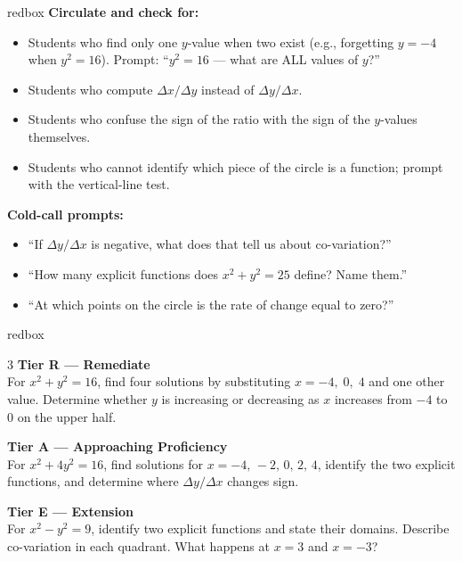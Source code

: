 \documentclass[10pt]{article}
\begin{document}
\begin{skillbox}{redbox}
\textbf{Circulate and check for:}
\begin{itemize}[leftmargin=1.5em, itemsep=2pt]
    \item Students who find only one $y$-value when two exist (e.g., forgetting $y = -4$ when
          $y^2 = 16$). Prompt: ``$y^2 = 16$ --- what are ALL values of $y$?''
    \item Students who compute $\Delta x/\Delta y$ instead of $\Delta y/\Delta x$.
    \item Students who confuse the sign of the ratio with the sign of the $y$-values themselves.
    \item Students who cannot identify which piece of the circle is a function; prompt with the
          vertical-line test.
\end{itemize}
\textbf{Cold-call prompts:}
\begin{itemize}[leftmargin=1.5em, itemsep=2pt]
    \item ``If $\Delta y/\Delta x$ is negative, what does that tell us about co-variation?''
    \item ``How many explicit functions does $x^2 + y^2 = 25$ define? Name them.''
    \item ``At which points on the circle is the rate of change equal to zero?''
\end{itemize}
\end{skillbox}

\begin{skillbox}{redbox}
\begin{multicols}{3}
\textbf{Tier R --- Remediate}\\
For $x^2 + y^2 = 16$, find four solutions by substituting $x = -4,\; 0,\; 4$ and one other
value. Determine whether $y$ is increasing or decreasing as $x$ increases from $-4$ to $0$
on the upper half.

\columnbreak
\textbf{Tier A --- Approaching Proficiency}\\
For $x^2 + 4y^2 = 16$, find solutions for $x = -4,\,-2,\,0,\,2,\,4$, identify the two
explicit functions, and determine where $\Delta y/\Delta x$ changes sign.

\columnbreak
\textbf{Tier E --- Extension}\\
For $x^2 - y^2 = 9$, identify two explicit functions and state their domains. Describe
co-variation in each quadrant. What happens at $x = 3$ and $x = -3$?
\end{multicols}
\end{skillbox}
\end{document}
